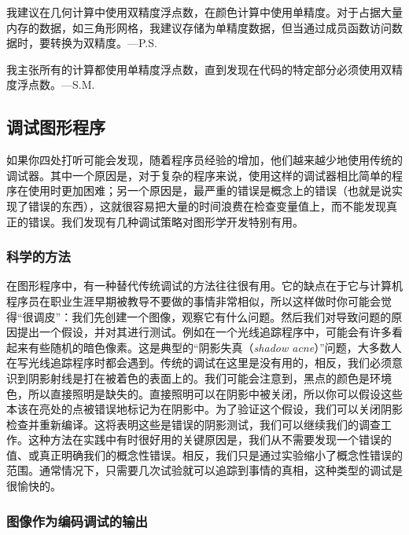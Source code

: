 \documentclass[lang=cn,12pt]{elegantbook}
\begin{document}
\begin{note}
  我建议在几何计算中使用双精度浮点数，在颜色计算中使用单精度。对于占据大量内存的数据，如三角形网格，我建议存储为单精度数据，但当通过成员函数访问数据时，要转换为双精度。—P.S.
\end{note}

\begin{note}
  我主张所有的计算都使用单精度浮点数，直到发现在代码的特定部分必须使用双精度浮点数。—S.M.
\end{note}

\subsection{调试图形程序}

如果你四处打听可能会发现，随着程序员经验的增加，他们越来越少地使用传统的调试器。其中一个原因是，对于复杂的程序来说，使用这样的调试器相比简单的程序在使用时更加困难；另一个原因是，最严重的错误是概念上的错误（也就是说实现了错误的东西），这就很容易把大量的时间浪费在检查变量值上，而不能发现真正的错误。我们发现有几种调试策略对图形学开发特别有用。

\subsubsection{科学的方法}

在图形程序中，有一种替代传统调试的方法往往很有用。它的缺点在于它与计算机程序员在职业生涯早期被教导不要做的事情非常相似，所以这样做时你可能会觉得“很调皮”：我们先创建一个图像，观察它有什么问题。然后我们对导致问题的原因提出一个假设，并对其进行测试。例如在一个光线追踪程序中，可能会有许多看起来有些随机的暗色像素。这是典型的“阴影失真（\textit{shadow acne}）”问题，大多数人在写光线追踪程序时都会遇到。传统的调试在这里是没有用的，相反，我们必须意识到阴影射线是打在被着色的表面上的。我们可能会注意到，黑点的颜色是环境色，所以直接照明是缺失的。直接照明可以在阴影中被关闭，所以你可以假设这些本该在亮处的点被错误地标记为在阴影中。为了验证这个假设，我们可以关闭阴影检查并重新编译。这将表明这些是错误的阴影测试，我们可以继续我们的调查工作。这种方法在实践中有时很好用的关键原因是，我们从不需要发现一个错误的值、或真正明确我们的概念性错误。相反，我们只是通过实验缩小了概念性错误的范围。通常情况下，只需要几次试验就可以追踪到事情的真相，这种类型的调试是很愉快的。

\subsubsection{图像作为编码调试的输出}
\end{document}
